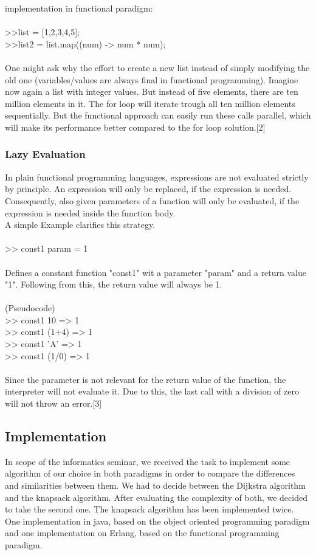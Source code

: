 implementation in functional paradigm:\\\\
>>list = [1,2,3,4,5];\\
>>list2 = list.map((num) -> num * num);\\\\
One might ask why the effort to create a new list instead of simply modifying the old one (variables/values are always final in functional programming). Imagine now again a list with integer values. But instead of five elements, there are ten million elements in it. The for loop will iterate trough all ten million elements sequentially. But the functional approach can easily run these calls parallel, which will make its performance better compared to the for loop solution.[2]
\subsubsection{Lazy Evaluation}
In plain functional programming languages, expressions are not evaluated strictly by principle. An expression will only be replaced, if the expression is needed. Consequently, also given parameters of a function will only be evaluated, if the expression is needed inside the function body.\\ 
A simple Example clarifies this strategy.\\\\
>> const1 param = 1\\\\
Defines a constant function "const1" wit a parameter "param" and a return value "1". Following from this, the return value will always be 1.\\\\
(Pseudocode)\\
>> const1 10 => 1\\
>> const1 (1+4) => 1\\
>> const1 'A' => 1\\
>> const1 (1/0) => 1\\\\
Since the parameter is not relevant for the return value of the function, the interpreter will not evaluate it. Due to this, the last call with a division of zero will not throw an error.[3]
\subsection{Implementation}
In scope of the informatics seminar, we received the task to implement some algorithm of our choice in both paradigms in order to compare the differences and similarities between them. We had to decide between the Dijkstra algorithm and the knapsack algorithm. After evaluating the complexity of both, we decided to take the second one. The knapsack algorithm has been implemented twice. One implementation in java, based on the object oriented programming paradigm and one implementation on Erlang, based on the functional programming paradigm.
